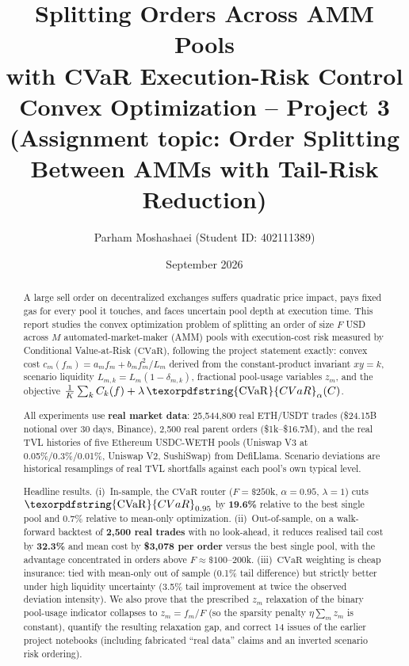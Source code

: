 \documentclass[11pt,a4paper]{article}
\title{\textbf{Splitting Orders Across AMM Pools\\
with CVaR Execution-Risk Control}\\[0.6em]
\large Convex Optimization -- Project 3\\
(Assignment topic: Order Splitting Between AMMs with Tail-Risk Reduction)}
\author{Parham Moshashaei \quad (Student ID: 402111389)}
\date{September 2026}
\theoremstyle{remark}
\newcommand{\cvar}{\texorpdfstring{\ensuremath{\mathrm{CVaR}}}{CVaR}}
\begin{document}
\maketitle
\thispagestyle{empty}

\begin{abstract}
\noindent
A large sell order on decentralized exchanges suffers quadratic price impact, pays fixed gas
for every pool it touches, and faces uncertain pool depth at execution time.  This report
studies the convex optimization problem of splitting an order of size $F$ USD across $M$
automated-market-maker (AMM) pools with execution-cost risk measured by Conditional
Value-at-Risk (\cvar{}), following the project statement exactly: convex cost
$c_m(f_m) = a_m f_m + b_m f_m^2/L_m$ derived from the constant-product invariant $xy=k$,
scenario liquidity $L_{m,k}=L_m(1-\delta_{m,k})$, fractional pool-usage variables $z_m$, and
the objective $\frac{1}{K}\sum_k C_k(f) + \lambda\,\cvar_\alpha(C)$.

All experiments use \textbf{real market data}: 25{,}544{,}800 real ETH/USDT trades
(\$24.15B notional over 30 days, Binance), 2{,}500 real parent orders (\$1k--\$16.7M), and
the real TVL histories of five Ethereum USDC-WETH pools (Uniswap V3 at 0.05\%/0.3\%/0.01\%,
Uniswap V2, SushiSwap) from DefiLlama.  Scenario deviations are historical resamplings of
real TVL shortfalls against each pool's own typical level.

Headline results.  (i)~In-sample, the \cvar{} router (\(F=\$250\)k, $\alpha=0.95$,
$\lambda=1$) cuts $\cvar_{0.95}$ by \textbf{19.6\%} relative to the best single pool and
0.7\% relative to mean-only optimization.  (ii)~Out-of-sample, on a walk-forward backtest of
\textbf{2{,}500 real trades} with no look-ahead, it reduces realised tail cost by
\textbf{32.3\%} and mean cost by \textbf{\$3{,}078 per order} versus the best single pool,
with the advantage concentrated in orders above $F\approx\$100$--$200$k.  (iii)~\cvar{}
weighting is cheap insurance: tied with mean-only out of sample (0.1\% tail difference) but
strictly better under high liquidity uncertainty (3.5\% tail improvement at twice the
observed deviation intensity).  We also prove that the prescribed $z_m$ relaxation of the
binary pool-usage indicator collapses to $z_m=f_m/F$ (so the sparsity penalty
$\eta\sum_m z_m$ is constant), quantify the resulting relaxation gap, and correct 14 issues
of the earlier project notebooks (including fabricated ``real data'' claims and an inverted
scenario risk ordering).
\end{abstract}
\end{document}
